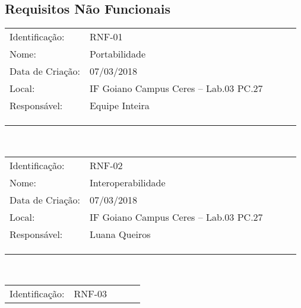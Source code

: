 \begin{center}
\section{Requisitos Não Funcionais}
 \begin{tabular*}{\textwidth}{@{\extracolsep{\fill}}V{2.5}gV{2.5}lV{2.5}}
    \myhline
    Identificação:& RNF-01\\
    \myhline
    Nome:&Portabilidade\\
    \myhline
    Data de Criação:&07/03/2018\\
    \myhline
    Local:&IF Goiano Campus Ceres – Lab.03 PC.27\\
    \myhline
    Responsável:&Equipe Inteira\\    
    \myhline
    \\
    \myhline
    \\
    \myhline
 \end{tabular*}\\
\vspace{0.5cm}
 \begin{tabular*}{\textwidth}{@{\extracolsep{\fill}}V{2.5}gV{2.5}lV{2.5}}
    \myhline
    Identificação:& RNF-02\\
    \myhline
    Nome:&Interoperabilidade\\
    \myhline
    Data de Criação:&07/03/2018\\
    \myhline
    Local:&IF Goiano Campus Ceres – Lab.03 PC.27\\
    \myhline
    Responsável:&Luana Queiros\\    
    \myhline
    \\
    \myhline
    \\
    \myhline
 \end{tabular*}\\
\vspace{0.5cm}
\begin{tabular*}{\textwidth}{@{\extracolsep{\fill}}V{2.5}gV{2.5}lV{2.5}}
    \myhline
    Identificação:& RNF-03\\

\end{tabular*}
\end{center}
